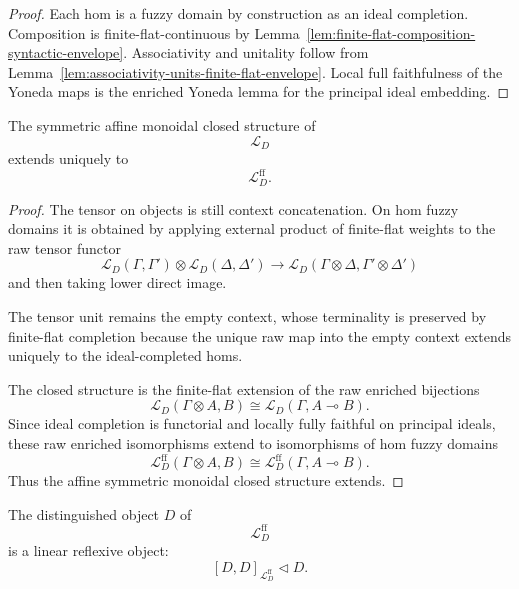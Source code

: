 \begin{proof}
Each hom is a fuzzy domain by construction as an ideal completion.  Composition
is finite-flat-continuous by
Lemma~\ref{lem:finite-flat-composition-syntactic-envelope}.  Associativity and
unitality follow from
Lemma~\ref{lem:associativity-units-finite-flat-envelope}.  Local full
faithfulness of the Yoneda maps is the enriched Yoneda lemma for the principal
ideal embedding.
\end{proof}

\begin{proposition}
\label{prop:affine-closed-structure-extends-to-envelope}
The symmetric affine monoidal closed structure of
\[
    \mathcal L_D
\]
extends uniquely to
\[
    \mathcal L_D^{\mathrm{ff}}.
\]
\end{proposition}

\begin{proof}
The tensor on objects is still context concatenation.  On hom fuzzy domains it
is obtained by applying external product of finite-flat weights to the raw
tensor functor
\[
    \mathcal L_D(\Gamma,\Gamma')
    \otimes
    \mathcal L_D(\Delta,\Delta')
    \longrightarrow
    \mathcal L_D(\Gamma\otimes\Delta,\Gamma'\otimes\Delta')
\]
and then taking lower direct image.

The tensor unit remains the empty context, whose terminality is preserved by
finite-flat completion because the unique raw map into the empty context
extends uniquely to the ideal-completed homs.

The closed structure is the finite-flat extension of the raw enriched
bijections
\[
    \mathcal L_D(\Gamma\otimes A,B)
    \cong
    \mathcal L_D(\Gamma,A\multimap B).
\]
Since ideal completion is functorial and locally fully faithful on principal
ideals, these raw enriched isomorphisms extend to isomorphisms of hom fuzzy
domains
\[
    \mathcal L_D^{\mathrm{ff}}(\Gamma\otimes A,B)
    \cong
    \mathcal L_D^{\mathrm{ff}}(\Gamma,A\multimap B).
\]
Thus the affine symmetric monoidal closed structure extends.
\end{proof}

\begin{proposition}
\label{prop:completed-syntactic-reflexive-object}
The distinguished object \(D\) of
\[
    \mathcal L_D^{\mathrm{ff}}
\]
is a linear reflexive object:
\[
    [D,D]_{\mathcal L_D^{\mathrm{ff}}}\triangleleft D.
\]
\end{proposition}

